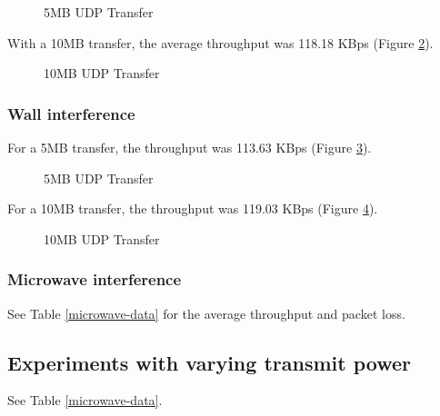 \documentclass[11pt]{article}
\begin{document}
\begin{figure}[htbp]
\centering
{}
\caption{5MB UDP Transfer}
\label{athome.01}
\end{figure}

\newpage

With a 10MB transfer, the average throughput was 118.18 KBps (Figure \ref{athome.02}).

\begin{figure}[htbp]
\centering
{}
\caption{10MB UDP Transfer}
\label{athome.02}
\end{figure}

\subsubsection{Wall interference}

For a 5MB transfer, the throughput was 113.63 KBps (Figure \ref{athome.03}).

\begin{figure}[htbp]
\centering
{}
\caption{5MB UDP Transfer}
\label{athome.03}
\end{figure}

For a 10MB transfer, the throughput was 119.03 KBps (Figure \ref{athome.04}).

\begin{figure}[htbp]
\centering
{}
\caption{10MB UDP Transfer}
\label{athome.04}
\end{figure}

\subsubsection{Microwave interference}

See Table \ref{microwave-data} for the average throughput and packet loss.

\subsection{Experiments with varying transmit power}

See Table \ref{microwave-data}.
\end{document}
